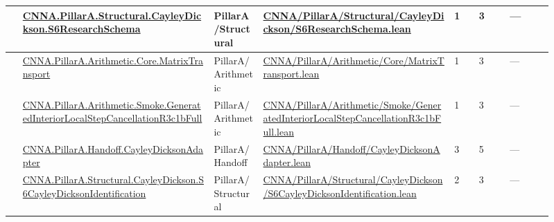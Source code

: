 \begin{longtable}{L{0.025\linewidth} L{0.315\linewidth} L{0.08\linewidth} L{0.315\linewidth} L{0.045\linewidth} L{0.055\linewidth} L{0.07\linewidth}}
\hline
{} & \href{run:repo_snapshot/CNNA/PillarA/Structural/CayleyDickson/S6ResearchSchema.lean}{CNNA.\allowbreak{}PillarA.\allowbreak{}Structural.\allowbreak{}CayleyDickson.\allowbreak{}S6ResearchSchema} & PillarA/\allowbreak{}Structural & \href{run:repo_snapshot/CNNA/PillarA/Structural/CayleyDickson/S6ResearchSchema.lean}{CNNA/\allowbreak{}PillarA/\allowbreak{}Structural/\allowbreak{}CayleyDickson/\allowbreak{}S6ResearchSchema.\allowbreak{}lean} & 1 & 3 & ---\\
\hline
{} & \href{run:repo_snapshot/CNNA/PillarA/Arithmetic/Core/MatrixTransport.lean}{CNNA.\allowbreak{}PillarA.\allowbreak{}Arithmetic.\allowbreak{}Core.\allowbreak{}MatrixTransport} & PillarA/\allowbreak{}Arithmetic & \href{run:repo_snapshot/CNNA/PillarA/Arithmetic/Core/MatrixTransport.lean}{CNNA/\allowbreak{}PillarA/\allowbreak{}Arithmetic/\allowbreak{}Core/\allowbreak{}MatrixTransport.\allowbreak{}lean} & 1 & 3 & ---\\
\hline
{} & \href{run:repo_snapshot/CNNA/PillarA/Arithmetic/Smoke/GeneratedInteriorLocalStepCancellationR3c1bFull.lean}{CNNA.\allowbreak{}PillarA.\allowbreak{}Arithmetic.\allowbreak{}Smoke.\allowbreak{}GeneratedInteriorLocalStepCancellationR3c1bFull} & PillarA/\allowbreak{}Arithmetic & \href{run:repo_snapshot/CNNA/PillarA/Arithmetic/Smoke/GeneratedInteriorLocalStepCancellationR3c1bFull.lean}{CNNA/\allowbreak{}PillarA/\allowbreak{}Arithmetic/\allowbreak{}Smoke/\allowbreak{}GeneratedInteriorLocalStepCancellationR3c1bFull.\allowbreak{}lean} & 1 & 3 & ---\\
\hline
{} & \href{run:repo_snapshot/CNNA/PillarA/Handoff/CayleyDicksonAdapter.lean}{CNNA.\allowbreak{}PillarA.\allowbreak{}Handoff.\allowbreak{}CayleyDicksonAdapter} & PillarA/\allowbreak{}Handoff & \href{run:repo_snapshot/CNNA/PillarA/Handoff/CayleyDicksonAdapter.lean}{CNNA/\allowbreak{}PillarA/\allowbreak{}Handoff/\allowbreak{}CayleyDicksonAdapter.\allowbreak{}lean} & 3 & 5 & ---\\
\hline
{} & \href{run:repo_snapshot/CNNA/PillarA/Structural/CayleyDickson/S6CayleyDicksonIdentification.lean}{CNNA.\allowbreak{}PillarA.\allowbreak{}Structural.\allowbreak{}CayleyDickson.\allowbreak{}S6CayleyDicksonIdentification} & PillarA/\allowbreak{}Structural & \href{run:repo_snapshot/CNNA/PillarA/Structural/CayleyDickson/S6CayleyDicksonIdentification.lean}{CNNA/\allowbreak{}PillarA/\allowbreak{}Structural/\allowbreak{}CayleyDickson/\allowbreak{}S6CayleyDicksonIdentification.\allowbreak{}lean} & 2 & 3 & ---\\

\end{longtable}
